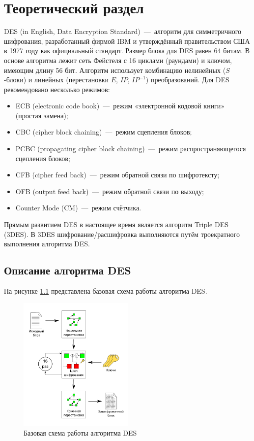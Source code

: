 \chapter{Теоретический раздел}

DES (in English, Data Encryption Standard)~---~алгоритм для симметричного шифрования, разработанный фирмой IBM и утверждённый правительством США в 1977 году как официальный стандарт. Размер блока для DES равен 64 битам. В основе алгоритма лежит сеть Фейстеля с 16 циклами (раундами) и ключом, имеющим длину 56 бит. Алгоритм использует комбинацию нелинейных ($S$-блоки) и линейных (перестановки $E$, $IP$, $IP^{-1}$) преобразований. Для DES рекомендовано несколько режимов:

\begin{itemize}
	\item ECB (electronic code book)~---~режим «электронной кодовой книги» (простая замена);
	\item CBC (cipher block chaining)~---~режим сцепления блоков;
	\item PCBC (propagating cipher block chaining)~---~режим распространяющегося сцепления блоков;
	\item CFB (cipher feed back)~---~режим обратной связи по шифротексту;
	\item OFB (output feed back)~---~режим обратной связи по выходу;
	\item Counter Mode (CM)~---~режим счётчика.
\end{itemize}
     
Прямым развитием DES в настоящее время является алгоритм Triple DES (3DES). В 3DES шифрование/расшифровка выполняются путём троекратного выполнения алгоритма DES. 

\section{Описание алгоритма DES}

На рисунке \ref{fig:des_basic_schema} представлена базовая схема работы алгоритма DES.

\newpage

\begin{figure}[h!]
\centering
\includegraphics[width=0.5\textwidth]{assets/des_basic_schema.png}
\caption{Базовая схема работы алгоритма DES}
\label{fig:des_basic_schema}
\end{figure}

